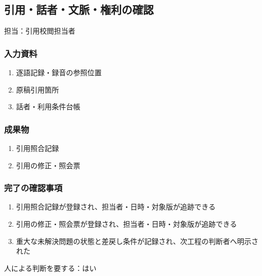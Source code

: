 \documentclass[a4paper,11pt]{article}
\begin{document}
\subsection{引用・話者・文脈・権利の確認}
\par 担当：引用校閲担当者\par\medskip
\subsubsection*{入力資料}
\begin{enumerate}[leftmargin=2em,itemsep=0.35em]
\item 逐語記録・録音の参照位置
\item 原稿引用箇所
\item 話者・利用条件台帳
\end{enumerate}
\subsubsection*{成果物}
\begin{enumerate}[leftmargin=2em,itemsep=0.35em]
\item 引用照合記録
\item 引用の修正・照会票
\end{enumerate}
\subsubsection*{完了の確認事項}
\begin{enumerate}[leftmargin=2em,itemsep=0.35em]
\item 引用照合記録が登録され、担当者・日時・対象版が追跡できる
\item 引用の修正・照会票が登録され、担当者・日時・対象版が追跡できる
\item 重大な未解決問題の状態と差戻し条件が記録され、次工程の判断者へ明示された
\end{enumerate}
\par 人による判断を要する：はい\par\medskip
\end{document}
